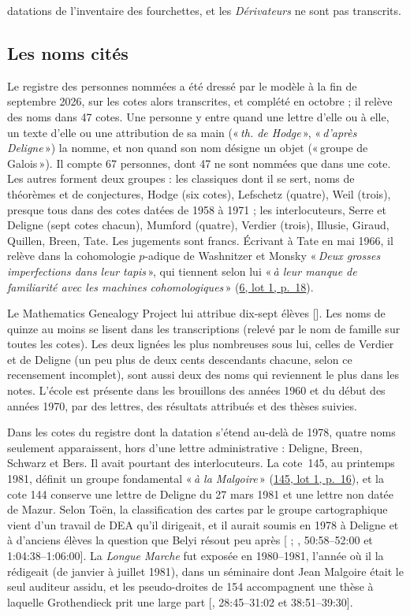 \documentclass[11pt]{amsart}
\makeatletter
\newcommand{\ts}[1]{\foreignlanguage{english}{#1}}
\newcommand{\q}[1]{«\,\textit{#1}\,»}
\newcommand{\mot}[1]{«\,#1\,»}
\def\RHM@first#1--#2\@nil{#1}
\DeclareRobustCommand{\lot}[3]{\begingroup\edef\RHM@pdfpage{\the\numexpr\RHM@first#3--\@nil+1\relax}\href{https://grothendieck.umontpellier.fr/#1.pdf\#page=\RHM@pdfpage}{#1, lot #2, p.~#3}\endgroup}
\newcommand{\lot}[3]{\href{https://grothendieck.commutator.io/\##1/#2/p#3}{#1, lot #2, p.~#3}}
\makeatother
\begin{document}
datations de l'inventaire des fourchettes, et les \emph{Dérivateurs} ne sont pas transcrits.

\subsection{Les noms cités}\label{sub:noms}

Le registre des personnes nommées a été dressé par le modèle à la fin de septembre 2026, sur les cotes alors transcrites, et complété en octobre ; il relève des noms dans 47 cotes. Une personne y entre quand une lettre d'elle ou à elle, un texte d'elle ou une attribution de sa main (\q{th. de Hodge}, \q{d'après Deligne}) la nomme, et non quand son nom désigne un objet (\mot{groupe de Galois}). Il compte 67 personnes, dont 47 ne sont nommées que dans une cote. Les autres forment deux groupes : les classiques dont il se sert, noms de théorèmes et de conjectures, Hodge (six cotes), Lefschetz (quatre), Weil (trois), presque tous dans des cotes datées de 1958 à 1971 ; les interlocuteurs, Serre et Deligne (sept cotes chacun), Mumford (quatre), Verdier (trois), Illusie, Giraud, Quillen, Breen, Tate. Les jugements sont francs. Écrivant à Tate en mai 1966, il relève dans la cohomologie $p$-adique de Washnitzer et Monsky \q{Deux grosses imperfections dans leur tapis}, qui tiennent selon lui \q{à leur manque de familiarité avec les machines cohomologiques} (\lot{6}{1}{18}).

Le Mathematics Genealogy Project lui attribue dix-sept élèves [\citealp{mgp}]. Les noms de quinze au moins se lisent dans les transcriptions (relevé par le nom de famille sur toutes les cotes). Les deux lignées les plus nombreuses sous lui, celles de Verdier et de Deligne (un peu plus de deux cents descendants chacune, selon ce recensement incomplet), sont aussi deux des noms qui reviennent le plus dans les notes. L'école est présente dans les brouillons des années 1960 et du début des années 1970, par des lettres, des résultats attribués et des thèses suivies.

Dans les cotes du registre dont la datation s'étend au-delà de 1978, quatre noms seulement apparaissent, hors d'une lettre administrative : Deligne, Breen, Schwarz et Bers. Il avait pourtant des interlocuteurs. La cote~145, au printemps 1981, définit un groupe fondamental \q{à la Malgoire} (\lot{145}{1}{16}), et la cote 144 conserve une lettre de Deligne du 27 mars 1981 et une lettre non datée de Mazur. Selon Toën, la classification des cartes par le groupe cartographique vient d'un travail de DEA qu'il dirigeait, et il aurait soumis en 1978 à Deligne et à d'anciens élèves la question que Belyi résout peu après [\citealp{belyi1979} ; \citealp{toen2025}, \ts{50:58--52:00} et \ts{1:04:38--1:06:00}]. La \emph{Longue Marche} fut exposée en 1980--1981, l'année où il la rédigeait (de janvier à juillet 1981), dans un séminaire dont Jean Malgoire était le seul auditeur assidu, et les pseudo-droites de 154 accompagnent une thèse à laquelle Grothendieck prit une large part [\citealp{malgoire2017a}, \ts{28:45--31:02} et \ts{38:51--39:30}].
\end{document}
